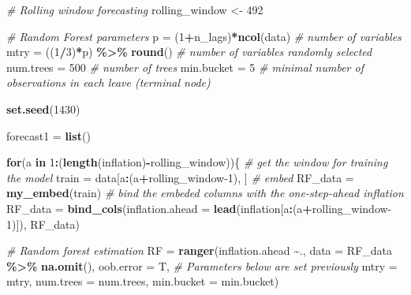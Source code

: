 \documentclass[
]{article}
\newenvironment{Shaded}{\begin{snugshade}}{\end{snugshade}}
\newcommand{\AttributeTok}[1]{\textcolor[rgb]{0.13,0.29,0.53}{#1}}
\newcommand{\CommentTok}[1]{\textcolor[rgb]{0.56,0.35,0.01}{\textit{#1}}}
\newcommand{\ControlFlowTok}[1]{\textcolor[rgb]{0.13,0.29,0.53}{\textbf{#1}}}
\newcommand{\DecValTok}[1]{\textcolor[rgb]{0.00,0.00,0.81}{#1}}
\newcommand{\FunctionTok}[1]{\textcolor[rgb]{0.13,0.29,0.53}{\textbf{#1}}}
\newcommand{\NormalTok}[1]{#1}
\newcommand{\OtherTok}[1]{\textcolor[rgb]{0.56,0.35,0.01}{#1}}
\newcommand{\SpecialCharTok}[1]{\textcolor[rgb]{0.81,0.36,0.00}{\textbf{#1}}}
\begin{document}
\begin{Shaded}
\begin{Highlighting}[]
\CommentTok{\# Rolling window forecasting}
\NormalTok{rolling\_window }\OtherTok{\textless{}{-}} \DecValTok{492}

\CommentTok{\# Random Forest parameters}
\NormalTok{p }\OtherTok{=}\NormalTok{ (}\DecValTok{1}\SpecialCharTok{+}\NormalTok{n\_lags)}\SpecialCharTok{*}\FunctionTok{ncol}\NormalTok{(data) }\CommentTok{\# number of variables}
\NormalTok{mtry }\OtherTok{=}\NormalTok{ ((}\DecValTok{1}\SpecialCharTok{/}\DecValTok{3}\NormalTok{)}\SpecialCharTok{*}\NormalTok{p) }\SpecialCharTok{\%\textgreater{}\%} \FunctionTok{round}\NormalTok{() }\CommentTok{\# number of variables randomly selected}
\NormalTok{num.trees }\OtherTok{=} \DecValTok{500} \CommentTok{\# number of trees}
\NormalTok{min.bucket }\OtherTok{=} \DecValTok{5} \CommentTok{\# minimal number of observations in each leave (terminal node)}


\FunctionTok{set.seed}\NormalTok{(}\DecValTok{1430}\NormalTok{)}

\NormalTok{forecast1 }\OtherTok{=} \FunctionTok{list}\NormalTok{()}

\ControlFlowTok{for}\NormalTok{(a }\ControlFlowTok{in} \DecValTok{1}\SpecialCharTok{:}\NormalTok{(}\FunctionTok{length}\NormalTok{(inflation)}\SpecialCharTok{{-}}\NormalTok{rolling\_window))\{}
  \CommentTok{\# get the window for training the model}
\NormalTok{  train }\OtherTok{=}\NormalTok{ data[a}\SpecialCharTok{:}\NormalTok{(a}\SpecialCharTok{+}\NormalTok{rolling\_window}\DecValTok{{-}1}\NormalTok{), ]}
  \CommentTok{\# embed}
\NormalTok{  RF\_data }\OtherTok{=} \FunctionTok{my\_embed}\NormalTok{(train)}
  \CommentTok{\# bind the embeded columns with the one{-}step{-}ahead inflation}
\NormalTok{  RF\_data }\OtherTok{=} \FunctionTok{bind\_cols}\NormalTok{(}\AttributeTok{inflation.ahead =} \FunctionTok{lead}\NormalTok{(inflation[a}\SpecialCharTok{:}\NormalTok{(a}\SpecialCharTok{+}\NormalTok{rolling\_window}\DecValTok{{-}1}\NormalTok{)]), RF\_data) }
  
  \CommentTok{\# Random forest estimation}
\NormalTok{  RF }\OtherTok{=} \FunctionTok{ranger}\NormalTok{(inflation.ahead }\SpecialCharTok{\textasciitilde{}}\NormalTok{.,}
              \AttributeTok{data =}\NormalTok{ RF\_data }\SpecialCharTok{\%\textgreater{}\%} \FunctionTok{na.omit}\NormalTok{(),}
              \AttributeTok{oob.error =}\NormalTok{ T,}
              \CommentTok{\# Parameters below are set previously}
              \AttributeTok{mtry =}\NormalTok{ mtry, }
              \AttributeTok{num.trees =}\NormalTok{ num.trees,}
              \AttributeTok{min.bucket =}\NormalTok{ min.bucket)}
  

\end{Highlighting}
\end{Shaded}
\end{document}
